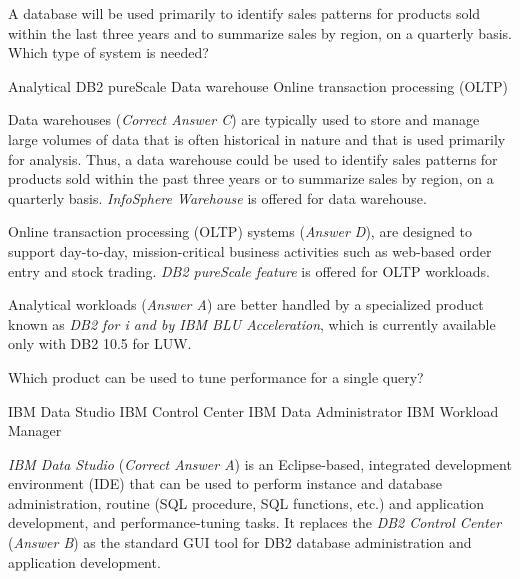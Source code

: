 \documentclass[answers, 11pt]{exam}
\begin{document}
\begin{questions}


\addpoints
\question[1]
A database will be used primarily to identify sales patterns
for products sold within the last three years and to summarize
sales by region, on a quarterly basis. Which type of system is 
needed?
\begin{choices}
\choice Analytical
\choice DB2 pureScale
\CorrectChoice Data warehouse
\choice Online transaction processing (OLTP)
\end{choices}

\begin{solution}
Data warehouses (\textit{Correct Answer C}) are typically used to store and manage large volumes of data that is often
historical in nature and that is used primarily for analysis. Thus, a data warehouse could be used to identify sales patterns
for products sold within the past three years or to summarize sales by region, on a quarterly basis. \textit{InfoSphere Warehouse} is offered for data warehouse.
\par

Online transaction processing (OLTP) systems (\textit{Answer D}), are designed to support day-to-day, mission-critical business
activities such as web-based order entry and stock trading. \textit{DB2 pureScale feature} is offered for OLTP workloads. 
\par

{\color{red} Analytical} workloads (\textit{Answer A}) are better handled by a specialized product
known as \textit{DB2 for i and by IBM BLU Acceleration}, which is currently available
only with DB2 10.5 for LUW.

\end{solution}

\question[1]
Which product can be used to tune performance for a single query?
\begin{choices}
\CorrectChoice IBM Data Studio
\choice IBM Control Center
\choice IBM Data Administrator
\choice IBM Workload Manager
\end{choices}

\begin{solution}
\textit{IBM Data Studio} (\textit{Correct Answer A}) is an Eclipse-based, integrated
development environment (IDE) that can be used to perform instance and database
administration, routine (SQL procedure, SQL functions, etc.) and application
development, and performance-tuning tasks. It replaces the \textit{DB2 Control Center} 
(\textit{Answer B}) as the standard GUI tool for DB2 database administration and
application development.
\par


\end{solution}
\end{questions}
\end{document}
